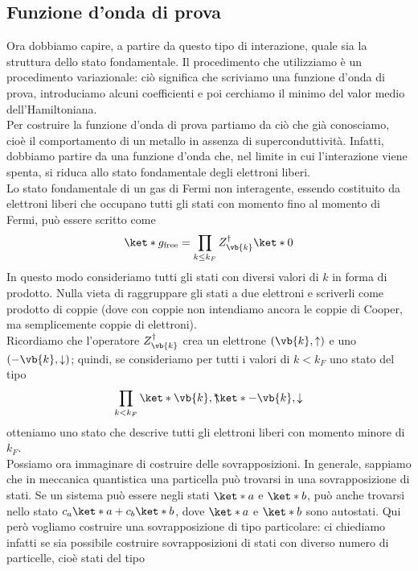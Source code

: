 \subsection{Funzione d'onda di prova}
Ora dobbiamo capire, a partire da questo tipo di interazione, quale sia la struttura dello stato fondamentale. Il procedimento che utilizziamo è un procedimento variazionale: ciò significa che scriviamo una funzione d'onda di prova, introduciamo alcuni coefficienti e poi cerchiamo il minimo del valor medio dell'Hamiltoniana.\\
Per costruire la funzione d'onda di prova partiamo da ciò che già conosciamo, cioè il comportamento di un metallo in assenza di superconduttività. Infatti, dobbiamo partire da una funzione d'onda che, nel limite in cui l'interazione viene spenta, si riduca allo stato fondamentale degli elettroni liberi.\\
Lo stato fondamentale di un gas di Fermi non interagente, essendo costituito da elettroni liberi che occupano tutti gli stati con momento fino al momento di Fermi, può essere scritto come
\begin{equation*}
   \ket*{g_{\rm free}}
   =\prod_{k \leq k_F} Z^{\dag}_{\vb{k}} \ket*{0}
\end{equation*}
In questo modo consideriamo tutti gli stati con diversi valori di $k$ in forma di prodotto. Nulla vieta di raggruppare gli stati a due elettroni e scriverli come prodotto di coppie (dove con coppie non intendiamo ancora le coppie di Cooper, ma semplicemente coppie di elettroni).\\
Ricordiamo che l'operatore $Z^{\dag}_{\vb{k}}$ crea un elettrone $(\vb{k},\uparrow)$ e uno $(-\vb{k},\downarrow)$; quindi, se consideriamo per tutti i valori di $k<k_F$ uno stato del tipo
\begin{equation*}
   \prod_{k<k_F} \ket*{\vb{k},\uparrow} \hspace{-0.17cm} \ket*{-\vb{k},\downarrow}
\end{equation*}
otteniamo uno stato che descrive tutti gli elettroni liberi con momento minore di $k_F$.\\
Possiamo ora immaginare di costruire delle sovrapposizioni. In generale, sappiamo che in meccanica quantistica una particella può trovarsi in una sovrapposizione di stati. Se un sistema può essere negli stati $\ket*{a}$ e $\ket*{b}$, può anche trovarsi nello stato $c_a \ket*{a} + c_b \ket*{b}$, dove $\ket*{a}$ e $\ket*{b}$ sono autostati. Qui però vogliamo costruire una sovrapposizione di tipo particolare: ci chiediamo infatti se sia possibile costruire sovrapposizioni di stati con diverso numero di particelle, cioè stati del tipo
